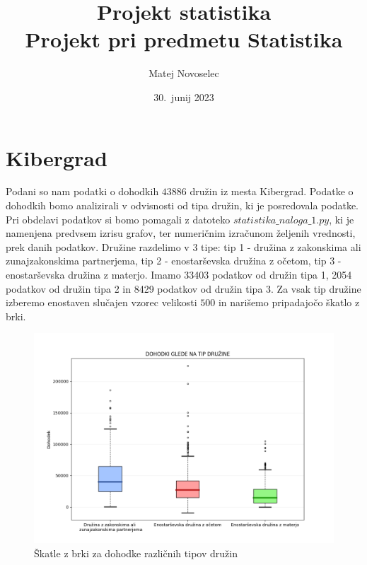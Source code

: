 \documentclass{article}
\begin{document}
\title{Projekt statistika\\
    \large Projekt pri predmetu Statistika
}
\author{
    Matej Novoselec\\
}
\date{30.\ junij 2023}

\maketitle
\pagebreak

\section{Kibergrad}
Podani so nam podatki o dohodkih $43886$ družin iz mesta Kibergrad. Podatke o dohodkih bomo analizirali v odvisnosti od tipa družin, ki je posredovala podatke. 
Pri obdelavi podatkov si bomo pomagali z datoteko $statistika\_naloga\_1.py$, ki je namenjena predvsem izrisu grafov, ter numeričnim izračunom željenih vrednosti, prek danih podatkov. 
\newline
Družine razdelimo v $3$ tipe: tip 1 - družina z zakonskima ali zunajzakonskima partnerjema, tip 2 - enostarševska družina z očetom, tip 3 - enostarševska družina z materjo.
Imamo 33403 podatkov od družin tipa 1, 2054 podatkov od družin tipa 2 in 8429 podatkov od družin tipa 3.
Za vsak tip družine izberemo enostaven slučajen vzorec velikosti $500$ in narišemo pripadajočo škatlo z brki.

\begin{figure}[H]
    \begin{center}
    \includegraphics[width=\linewidth]{naloga1a.png}
    \vspace*{-10mm}\caption{Škatle z brki za dohodke različnih tipov družin}
    \end{center}    
\end{figure}
\end{document}
